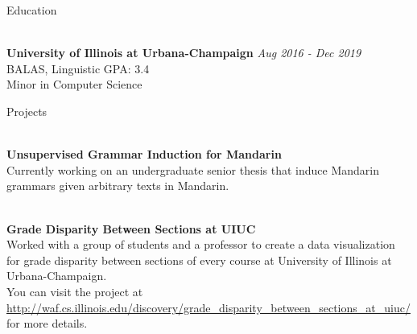 \documentclass{resume}
\begin{document}
\begin{rSection}{Education}


\\{\bf University of Illinois at Urbana-Champaign} \hfill {\em Aug 2016 - Dec 2019} 
\\ BALAS, Linguistic\hfill { GPA: 3.4 } \\
Minor in Computer Science \smallskip \\

\end{rSection}

\begin{rSection}{Projects}

\\{\bf Unsupervised Grammar Induction for Mandarin}\\
Currently working on an undergraduate senior thesis that induce Mandarin grammars given arbitrary texts in Mandarin.

\\{\bf Grade Disparity Between Sections at UIUC}\\
Worked with a group of students and a professor to create a data visualization for grade disparity between sections of every course at University of Illinois at Urbana-Champaign.\\
You can visit the project at \url{http://waf.cs.illinois.edu/discovery/grade_disparity_between_sections_at_uiuc/} for more details.

\end{rSection}
\end{document}
